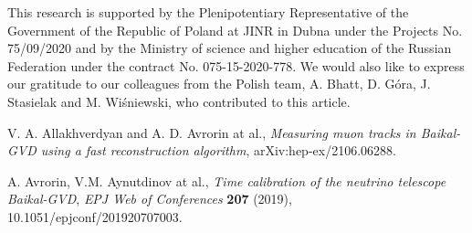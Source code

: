 \documentclass[a4paper,11pt]{article}
\begin{document}
%
%
%
%
\pagebreak
\thispagestyle{empty}
\acknowledgments
This research is supported by the Plenipotentiary Representative of the Government of the Republic of Poland at JINR in Dubna under the Projects No. 75/09/2020 and by the Ministry of science and higher education of the Russian Federation under the contract No. 075-15-2020-778.
We would also like to express our gratitude to our colleagues from the Polish team, A. Bhatt, D. Góra, J. Stasielak and M. Wiśniewski, who contributed to this article.

\begin{thebibliography}{99}
%	
	V. A. Allakhverdyan and A. D. Avrorin at al., \emph{Measuring muon tracks in Baikal-GVD using a fast reconstruction algorithm}, arXiv:hep-ex/2106.06288.
	
	A. Avrorin, V.M. Aynutdinov at al., \emph{Time calibration of the neutrino telescope Baikal-GVD}, \emph{EPJ Web of Conferences} {\bf 207} (2019), 10.1051/epjconf/201920707003.
	
%	
%	
%	
\end{thebibliography}
\end{document}
